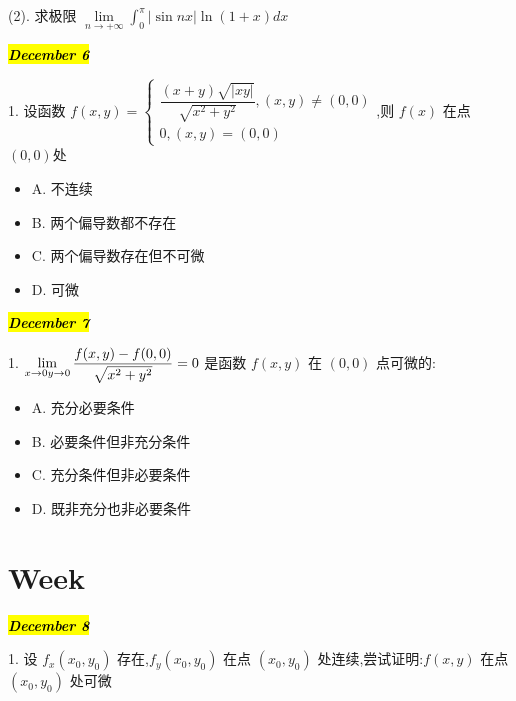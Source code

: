 (2). 求极限 $\lim\limits_{n\to +\infty}\int_{0}^{\pi}|\sin nx|\ln(1+x)dx$ 
\begin{solution}
	
\end{solution}

\hl{\textbf{\textit{December 6}}}

1. 设函数 $f(x,y)=\left\lbrace
	\begin{array}{l}
		\dfrac{(x+y)\sqrt{|xy|}}{\sqrt{x^{2}+y^{2}}},(x,y)\neq (0,0)\\
		0,(x,y)=(0,0)
	\end{array}
	\right.$,则 $f(x)$ 在点 $(0,0)$处
\begin{itemize}
	\item A. 不连续
	\item B. 两个偏导数都不存在
	\item C. 两个偏导数存在但不可微
	\item D. 可微
\end{itemize} 
\begin{solution}
	
\end{solution}

\hl{\textbf{\textit{December 7}}}

1. $\lim\limits_{x\to 0\\y\to 0}\dfrac{f(x,y)-f(0,0)}{\sqrt{x^{2}+y^{2}}}=0$ 是函数 $f(x,y)$ 在 $(0,0)$ 点可微的:
\begin{itemize}
	\item A. 充分必要条件
	\item B. 必要条件但非充分条件
	\item C. 充分条件但非必要条件
	\item D. 既非充分也非必要条件
\end{itemize} 
\begin{solution}
	
\end{solution}

\section{Week }
\hl{\textbf{\textit{December 8}}}

1. 设 $f_{x}(x_{0},y_{0})$ 存在,$f_{y}(x_{0},y_{0})$ 在点 $(x_{0},y_{0})$ 处连续,尝试证明:$f(x,y)$ 在点 $(x_{0},y_{0})$ 处可微
\begin{solution}
	
\end{solution}

